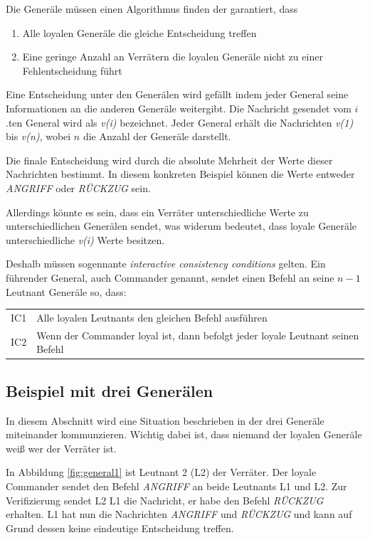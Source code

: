 \documentclass{article}
\begin{document}
\medskip 

Die Generäle müssen einen Algorithmus finden der garantiert, dass

\begin{enumerate}[label=(\alph*)]
\item Alle loyalen Generäle die gleiche Entscheidung treffen 
\item Eine geringe Anzahl an Verrätern die loyalen Generäle nicht zu einer Fehlentscheidung führt
\end{enumerate}

Eine Entscheidung unter den Generälen wird gefällt indem jeder General seine Informationen an die anderen Generäle weitergibt. 
Die Nachricht gesendet vom $i$.ten General wird als \textit{v(i)} bezeichnet.
Jeder General erhält die Nachrichten \textit{v(1)} bis \textit{v(n)}, wobei $n$ die Anzahl der Generäle darstellt. 

Die finale Entscheidung wird durch die absolute Mehrheit der Werte dieser Nachrichten
bestimmt. In diesem konkreten Beispiel können die Werte entweder \textit{ANGRIFF} oder \textit{RÜCKZUG} sein.

Allerdings könnte es sein, dass ein Verräter unterschiedliche Werte zu unterschiedlichen Generälen sendet, 
was widerum bedeutet, dass loyale Generäle unterschiedliche \textit{v(i)} Werte besitzen. 

\medskip 

Deshalb müssen sogennante \textit{interactive consistency conditions} gelten.
Ein führender General, auch Commander genannt, sendet einen Befehl an seine $n - 1$ Leutnant 
Generäle so, dass:

\smallskip 

\begin{tabular}{l l}
IC1 & Alle loyalen Leutnants den gleichen Befehl ausführen \\
IC2 & Wenn der Commander loyal ist, dann befolgt jeder loyale Leutnant seinen Befehl
\end{tabular}

\subsection{Beispiel mit drei Generälen}
In diesem Abschnitt wird eine Situation beschrieben in der drei Generäle miteinander kommunzieren. 
Wichtig dabei ist, dass niemand der loyalen Generäle weiß wer der Verräter ist. 

\medskip

In Abbildung \ref{fig:general1} ist Leutnant 2 (L2) der Verräter. Der loyale Commander
sendet den Befehl \textit{ANGRIFF} an beide Leutnants L1 und L2. Zur Verifizierung sendet L2 L1 die Nachricht,
er habe den Befehl \textit{RÜCKZUG} erhalten. 
L1 hat nun die Nachrichten \textit{ANGRIFF} und \textit{RÜCKZUG} und 
kann auf Grund dessen keine eindeutige Entscheidung treffen. 
\end{document}
